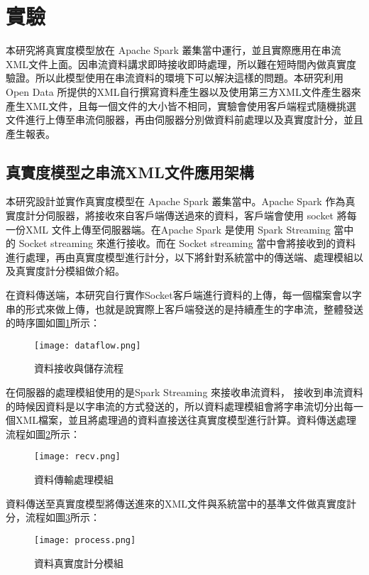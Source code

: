 \section{實驗}
本研究將真實度模型放在 Apache Spark 叢集當中運行，並且實際應用在串流XML文件上面。因串流資料講求即時接收即時處理，所以難在短時間內做真實度驗證。所以此模型使用在串流資料的環境下可以解決這樣的問題。本研究利用Open Data 所提供的XML自行撰寫資料產生器以及使用第三方XML文件產生器\cite{xmlgen}來產生XML文件，且每一個文件的大小皆不相同，實驗會使用客戶端程式隨機挑選文件進行上傳至串流伺服器，再由伺服器分別做資料前處理以及真實度計分，並且產生報表。\\\par
\subsection{真實度模型之串流XML文件應用架構}
本研究設計並實作真實度模型在 Apache Spark 叢集當中。Apache Spark 作為真實度計分伺服器，將接收來自客戶端傳送過來的資料，客戶端會使用 socket 將每一份XML 文件上傳至伺服器端。在Apache Spark 是使用 Spark Streaming 當中的 Socket streaming 來進行接收。而在 Socket streaming 當中會將接收到的資料進行處理，再由真實度模型進行計分，以下將針對系統當中的傳送端、處理模組以及真實度計分模組做介紹。\\\par

在資料傳送端，本研究自行實作Socket客戶端進行資料的上傳，每一個檔案會以字串的形式來做上傳，也就是說實際上客戶端發送的是持續產生的字串流，整體發送的時序圖如圖\ref{dataflow}所示：
\begin{figure}[H]
\centering
\graphicspath{{/Users/FUDA/Documents/masterThesis/image/}}
\texttt{[image: dataflow.png]}
\caption{資料接收與儲存流程}
\label{dataflow}
\end{figure}

在伺服器的處理模組使用的是Spark Streaming 來接收串流資料， 接收到串流資料的時候因資料是以字串流的方式發送的，所以資料處理模組會將字串流切分出每一個XML檔案，並且將處理過的資料直接送往真實度模型進行計算。資料傳送處理流程如圖\ref{recv}所示：
\begin{figure}[H]
\centering
\graphicspath{{/Users/FUDA/Documents/masterThesis/image/}}
\texttt{[image: recv.png]}
\caption{資料傳輸處理模組}
\label{recv}
\end{figure}
資料傳送至真實度模型將傳送進來的XML文件與系統當中的基準文件做真實度計分，流程如圖\ref{process}所示：
\begin{figure}[H]
\centering
\graphicspath{{/Users/FUDA/Documents/masterThesis/image/}}
\texttt{[image: process.png]}
\caption{資料真實度計分模組}
\label{process}
\end{figure}


